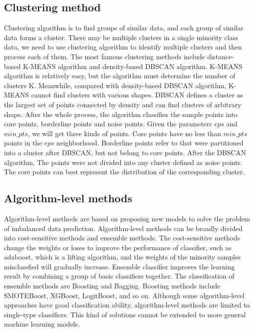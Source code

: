 \documentclass[runningheads]{llncs}
\begin{document}
\subsection{Clustering method}
Clustering algorithm is to find groups of similar data, and each group of similar data forms a cluster\cite{inproceedings}.
 There may be multiple clusters in a single minority class data, 
we need to use clustering algorithm to identify multiple clusters
 and then process each of them.
The most famous clustering methods include distance-based K-MEANS algorithm and density-based DBSCAN algorithm.
K-MEANS algorithm is relatively easy, but the algorithm must determine the number of clusters K.
Meanwhile, compared with density-based DBSCAN algorithm, K-MEANS cannot find clusters with various shapes.
DBSCAN defines a cluster as the largest set of points
 connected by density and can find clusters of arbitrary shape. After the whole process, the algorithm classifies the sample points into core points,
  borderline points and noise points.
 Given the parameters $eps$ and $min\_pts$, we will get three kinds of points. Core points have no less than
  $min\_pts$ points in the $eps$ neighborhood. Borderline points refer to that were partitioned into a cluster after DBSCAN,
  but not belong to core points. After the DBSCAN algorithm, The points were not divided into any cluster defined as noise points.
The core points can best represent the distribution of the corresponding cluster.

\subsection{Algorithm-level methods}
Algorithm-level methods are based on proposing 
new models to solve the problem of imbalanced data prediction\cite{Chen_2016,2007LogitBoost}.
 Algorithm-level methods can be broadly divided into cost-sensitive 
 methods\cite{2010Risk} and ensemble methods\cite{2003SMOTEBoost}.
The cost-sensitive methods change the weights or loses to improve the performance of classifier, such as 
adaboost\cite{10.1007/3-540-59119-2_166}, which is a lifting algorithm,
and the weights of the minority samples misclassfied will gradually increase.
Ensemble classifier improves the learning result by combining
 a group of basic classifiers together.
 The classification of ensemble methods are Boosting\cite{article_boosting} and Bagging\cite{2018Multi}.
 Boosting methods include SMOTEBoost\cite{2003SMOTEBoost},
XGBoost\cite{Chen_2016}, LogitBoost\cite{2007LogitBoost}, and so on.
Although some algorithm-level approaches have good classification ability, 
algorithm-level methods are limited to single-type classifiers\cite{2020Combined}.
This kind of solutions cannot be extended to more general machine learning models.
\end{document}
